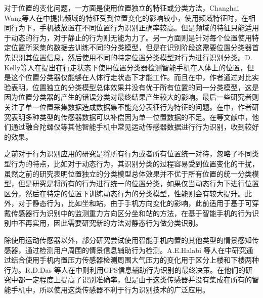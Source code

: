 \par 对于位置的变化问题，一方面是使用位置独立的特征或分类方法，Changhai Wang等人在\cite{frequencyForPosition}中提出频域的特征受到位置变化的影响较小，使用频域特征时，在相同行为下，手机被放置在不同位置行为识别正确率较高。但是频域的特征只能适用于动态的行为，对于静止的行为则无能为力了。另一方面则是针对每个位置使用特定位置所采集的数据去训练不同的分类模型，但是在识别阶段这需要位置分类器首先识别其位置信息，然后使用不同的特定位置分类模型对行为进行识别分类。D. Kelly等人在\cite{positionClassifier}提出在行走状态下使用位置分类器检测智能手机在人体上的位置，但是这个位置分类器仅能够在人体行走状态下才能工作。而且在\cite{positionClassifierProblem}中，作者通过对比实验表明，位置独立的分类模型总体效果并没有优于所有位置的同一分类模型，这是因为位置分类器的产生的错误分类对最终结果产生较大的影响。最后一些研究者则关注了单一位置采集数据造成数据集不能充分表征行为特征的问题。在\cite{otherSensorCompensate}中，作者研究表明多种类型的传感器数据可以补偿因为单一位置数据的不足。在\cite{othersensorInstance1}\cite{othersensorInstance2}等文献中，他们通过融合陀螺仪等其他智能手机中常见运动传感器数据进行行为识别，收到较好的效果。
\par 之前对于行为识别应用的研究是将所有行为或者所有位置统一对待，忽略了不同类型行为的特点，比如对于动态行为，其识别分类的过程容易受到位置变化的干扰，虽然之前的研究表明位置独立的分类模型总体效果并不优于所有位置的统一分类模型，但是研究是将所有的行为进行统一的位置分类，如果仅当动态行为下进行位置区分，然后在特定的位置下训练动态行为的分类模型，性能则会有较大提升。此外，对于静态行为，比如坐和站，由于手机方向变化的影响，此前适用于基于可穿戴传感器行为识别中的监测重力方向区分坐和站的方法，在基于智能手机的行为识别中不再实用，因此需要研究新的方法对静态行为做分类识别。
\par 除使用运动传感器以外，部分研究尝试使用智能手机内置的其他类型的情景感知传感器，通过检测用户周围的情景信息辅助行为检测。A.E.Halabi 等人在\cite{pressureSensor}中研究通过结合使用手机内置压力传感器检测周围大气压力的变化用于区分上楼和下楼两种行为。R.D.Das 等人在\cite{gps}中则利用GPS信息辅助行为识别的最终决策。在他们的研究中都一定程度上提高了识别准确率，但是由于这类传感器并没有集成在所有的智能手机中，所以使用这类传感器不利于行为识别技术的广泛应用。

